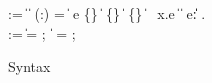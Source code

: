 \begin{figure}
{\small
\begin{bnf}
   \meta{\itmv} \::= 
     \| \Plit{\const} \|
    \Pfun{} (\var:\ity) = \itmv \| \itmv\; e \nlalt
    \Pstruct{} \{\overrightarrow {\var{:}\itmv}\} \| 
    \Punion{} \{\overrightarrow {\var{:}\itmv}\} \|
    \Palt{} \{\overrightarrow {\var{:}\itmv}\} \|
    \itmv \; \Pwhere{} \, x.e \nlalt
    \Popt{}\; \itmv \|
    \iParray{\itmv}{\itmv}{\itmv}{} \| 
    \Pcompute{} \; e{:}\ity \|
     \alpha \| \Prec{} \; \alpha . \itmv
     \\
    \::= \itmv \| \alpha = \itmv;\, \|
  \Prec{} \; \alpha = \itmv;\,
\end{bnf}
\caption{\ipads{} Syntax}
\label{fig:ipads-syntax}
}
\end{figure}





